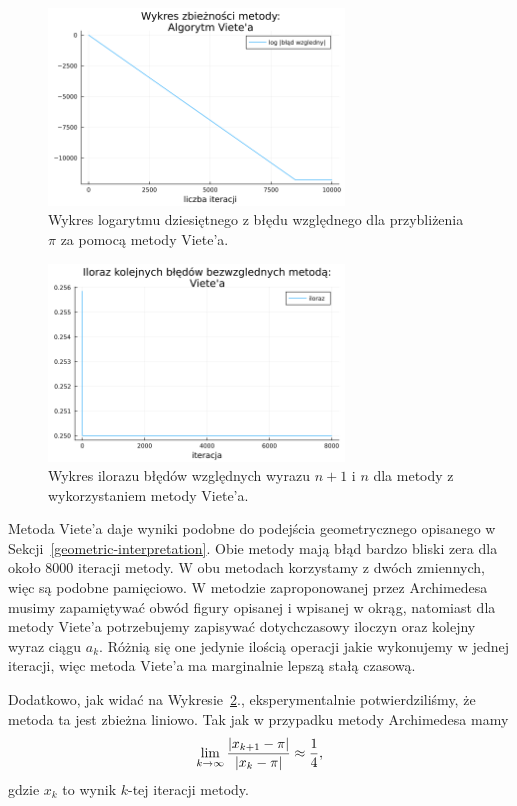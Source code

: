 \begin{figure}[!h]\centering
    \renewcommand{\figurename}{Wykres}
    \includegraphics[width=0.7\textwidth]{../prog/viete_log_error.png}
    \caption{Wykres logarytmu dziesiętnego z błędu względnego dla przybliżenia $\pi$ za pomocą metody Viete'a.}
    \label{viete-error}
\end{figure}

\begin{figure}[!h]\centering
    \renewcommand{\figurename}{Wykres}
    \includegraphics[width=0.7\textwidth]{../prog/viete_error_ratio.png}
    \caption{Wykres ilorazu błędów względnych wyrazu $n+1$ i $n$ dla metody z wykorzystaniem metody Viete'a.}
    \label{viete-convergence}
\end{figure}

Metoda Viete'a daje wyniki podobne do podejścia geometrycznego opisanego w Sekcji~\ref{geometric-interpretation}. Obie metody mają błąd bardzo bliski zera dla około 8000 iteracji metody. W obu metodach korzystamy z dwóch zmiennych, więc są podobne pamięciowo. W metodzie zaproponowanej przez Archimedesa musimy zapamiętywać obwód figury opisanej i wpisanej w okrąg, natomiast dla metody Viete'a potrzebujemy zapisywać dotychczasowy iloczyn oraz kolejny wyraz ciągu $a_k$. Różnią się one jedynie ilością operacji jakie wykonujemy w jednej iteracji, więc metoda Viete'a ma marginalnie lepszą stałą czasową.

Dodatkowo, jak widać na Wykresie~\ref{viete-convergence}., eksperymentalnie potwierdziliśmy, że metoda ta jest zbieżna liniowo. Tak jak w przypadku metody Archimedesa mamy
$$\lim_{k\to \infty}{|x_{k+1}-\pi|\over |x_k-\pi|}\approx\frac1{4},$$
gdzie $x_k$ to wynik $k$-tej iteracji metody.